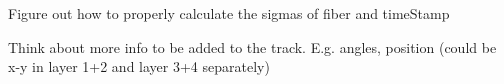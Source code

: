 
\begin{DoxyRefList}
\item[\label{todo__todo000001}%
\Hypertarget{todo__todo000001}%
Member \hyperlink{classCluster_aa12f4e548b102a48621ca7ec91bc2330}{Cluster\+:\+:add\+Signal} (const \hyperlink{classSignal}{Signal} \&signal)]Figure out how to properly calculate the sigmas of fiber and time\+Stamp  
\item[\label{todo__todo000002}%
\Hypertarget{todo__todo000002}%
Class \hyperlink{classTrack}{Track} ]Think about more info to be added to the track. E.\+g. angles, position (could be x-\/y in layer 1+2 and layer 3+4 separately) 
\end{DoxyRefList}